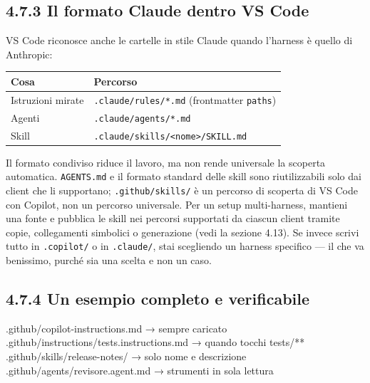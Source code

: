 \documentclass[
  italian,
  10pt,
]{book}
\newenvironment{Shaded}{\begin{snugshade}}{\end{snugshade}}
\newcommand{\NormalTok}[1]{#1}
\newcounter{none} %
\begin{document}
\subsection{4.7.3 Il formato Claude dentro VS
Code}\label{il-formato-claude-dentro-vs-code}

VS Code riconosce anche le cartelle in stile Claude quando l'harness è
quello di Anthropic:

{\def\LTcaptype{none} %
\begin{longtable}[]{@{}ll@{}}
\toprule\noalign{}
Cosa & Percorso \\
\midrule\noalign{}
\endhead
\bottomrule\noalign{}
\endlastfoot
Istruzioni mirate & \texttt{.claude/rules/*.md} (frontmatter
\texttt{paths}) \\
Agenti & \texttt{.claude/agents/*.md} \\
Skill &
\texttt{.claude/skills/\textless{}nome\textgreater{}/SKILL.md} \\
\end{longtable}
}

Il formato condiviso riduce il lavoro, ma non rende universale la
scoperta automatica. \texttt{AGENTS.md} e il formato standard delle
skill sono riutilizzabili solo dai client che li supportano;
\texttt{.github/skills/} è un percorso di scoperta di VS Code con
Copilot, non un percorso universale. Per un setup multi-harness,
mantieni una fonte e pubblica le skill nei percorsi supportati da
ciascun client tramite copie, collegamenti simbolici o generazione (vedi
la sezione 4.13). Se invece scrivi tutto in \texttt{.copilot/} o in
\texttt{.claude/}, stai scegliendo un harness specifico --- il che va
benissimo, purché sia una scelta e non un caso.

\subsection{4.7.4 Un esempio completo e
verificabile}\label{un-esempio-completo-e-verificabile}

\begin{Shaded}
\begin{Highlighting}[]
\NormalTok{.github/copilot{-}instructions.md      → sempre caricato}
\NormalTok{.github/instructions/tests.instructions.md → quando tocchi tests/**}
\NormalTok{.github/skills/release{-}notes/        → solo nome e descrizione}
\NormalTok{.github/agents/revisore.agent.md     → strumenti in sola lettura}
\end{Highlighting}
\end{Shaded}
\end{document}
